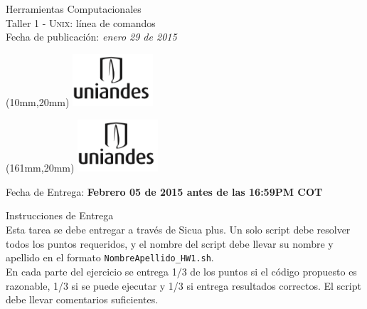 \documentclass[11pt,letterpaper]{exam}
\begin{document}
\begin{center}
{\Large Herramientas Computacionales} \\
Taller 1 - \textsc{Unix}: línea de comandos \\
Fecha de publicación: {\small \it enero 29 de 2015}\\
\end{center}

\begin{textblock*}{40mm}(10mm,20mm)
  \includegraphics[width=3cm]{logoUniandes.png}
\end{textblock*}

\begin{textblock*}{40mm}(161mm,20mm)
  \includegraphics[width=3cm]{logoUniandes.png}
\end{textblock*}

\vspace{0.5cm}

{\Large Fecha de Entrega:  \bf Febrero 05 de 2015 antes de las 16:59PM COT}

\vspace{0.5cm}

{\Large Instrucciones de Entrega}\\

Esta tarea se debe entregar a través de Sicua plus. Un solo script debe resolver todos los puntos requeridos, y el nombre del script debe llevar su nombre y apellido en el formato \verb"NombreApellido_HW1.sh". \\

En cada parte del ejercicio se entrega 1/3  de los puntos si el código propuesto es razonable, 1/3 si se puede ejecutar y 1/3 si entrega resultados correctos. El script debe llevar comentarios suficientes.


\vspace{0.5cm}
\end{document}
